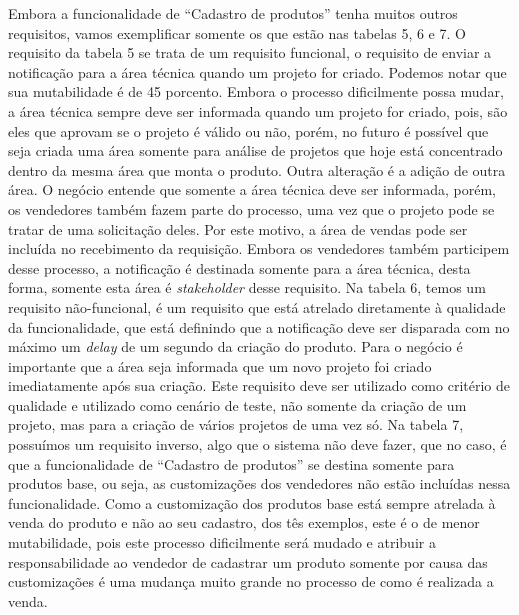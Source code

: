       Embora a funcionalidade de “Cadastro de produtos” tenha muitos outros requisitos,
      vamos exemplificar somente os que estão nas tabelas 5, 6 e 7.
      O requisito da tabela 5 se trata de um requisito funcional, o requisito de
      enviar a notificação para a área técnica quando um projeto for criado. Podemos
      notar que sua mutabilidade é de 45 porcento. Embora o processo dificilmente possa mudar,
      a área técnica sempre deve ser informada quando um projeto for criado, pois,
      são eles que aprovam se o projeto é válido ou não, porém, no futuro é possível
      que seja criada uma área somente para análise de projetos que hoje está
      concentrado dentro da mesma área que monta o produto. Outra alteração é a
      adição de outra área. O negócio entende que somente a área técnica deve
      ser informada, porém, os vendedores também fazem parte do processo, uma vez que
      o projeto pode se tratar de uma solicitação deles. Por este motivo, a área de
      vendas pode ser incluída no recebimento da requisição. Embora os vendedores
      também participem desse processo, a notificação é destinada somente para a área
      técnica, desta forma, somente esta área é \textit{stakeholder} desse
      requisito. Na tabela 6, temos um requisito não-funcional, é um requisito
      que está atrelado diretamente à qualidade da funcionalidade, que está definindo
      que a notificação deve ser disparada com no máximo um \textit{delay} de um
      segundo da criação do produto. Para o negócio é importante que a área seja
      informada que um novo projeto foi criado imediatamente após sua criação. Este
      requisito deve ser utilizado como critério de qualidade e utilizado como cenário
      de teste, não somente da criação de um projeto, mas para a criação de vários
      projetos de uma vez só. Na tabela 7, possuímos um requisito inverso, algo
      que o sistema não deve fazer, que no caso, é que a funcionalidade de “Cadastro
      de produtos” se destina somente para produtos base, ou seja, as customizações
      dos vendedores não estão incluídas nessa funcionalidade. Como a customização
      dos produtos base está sempre atrelada à venda do produto e não ao seu cadastro,
      dos tês exemplos, este é o de menor mutabilidade, pois este processo dificilmente
      será mudado e atribuir a responsabilidade ao vendedor de cadastrar um produto
      somente por causa das customizações é uma mudança muito grande no processo
      de como é realizada a venda.

